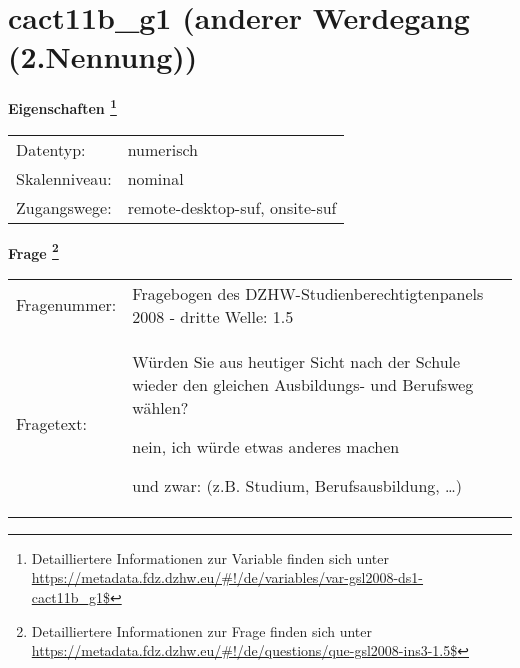 
    \setcounter{footnote}{0}

    \vspace*{-1.8cm}
	\section{cact11b\_g1 (anderer Werdegang (2.Nennung))}
	\label{section:cact11b_g1}



    \vspace*{0.5cm}
    \noindent\textbf{Eigenschaften
	\footnote{Detailliertere Informationen zur Variable finden sich unter
		\url{https://metadata.fdz.dzhw.eu/\#!/de/variables/var-gsl2008-ds1-cact11b_g1$}}}\\
	\begin{tabularx}{\hsize}{@{}lX}
	Datentyp: & numerisch \\
	Skalenniveau: & nominal \\
	Zugangswege: &
	  remote-desktop-suf, 
	  onsite-suf
 \\
    \end{tabularx}



				\vspace*{0.5cm}
                \noindent\textbf{Frage
	                \footnote{Detailliertere Informationen zur Frage finden sich unter
		              \url{https://metadata.fdz.dzhw.eu/\#!/de/questions/que-gsl2008-ins3-1.5$}}}\\
				\begin{tabularx}{\hsize}{@{}lX}
					Fragenummer: &
					  Fragebogen des DZHW-Studienberechtigtenpanels 2008 - dritte Welle:
					  1.5
 \\
					Fragetext: & Würden Sie aus heutiger Sicht nach der Schule wieder den gleichen Ausbildungs- und Berufsweg wählen?\par  nein, ich würde etwas anderes machen\par  und zwar: (z.B. Studium, Berufsausbildung, …) \\
				\end{tabularx}





